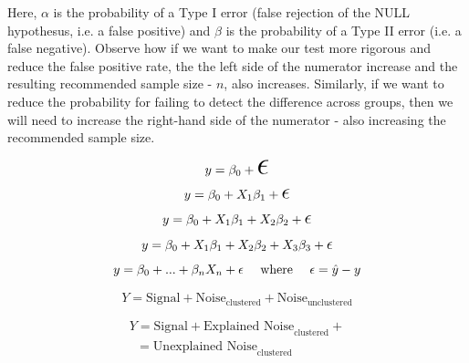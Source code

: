 \documentclass[12pt]{article}
\begin{document}
Here, $\alpha$ is the probability of a Type I error (false rejection of the NULL hypothesus, i.e. a false positive) and $\beta$ is the probability of a Type II error (i.e. a false negative). Observe how if we want to make our test more rigorous and reduce the false positive rate, the the left side of the numerator increase and the resulting recommended sample size - $n$, also increases. Similarly, if we want to reduce the probability for failing to detect the difference across groups, then we will need to increase the right-hand side of the numerator - also increasing the recommended sample size.

\newpage
\[ y = \beta_0 + \mathlarger{\mathlarger{\mathlarger{\mathlarger{\mathlarger{\mathlarger{\epsilon}}}}}} \]
\[ y = \beta_0 + X_1\beta_1 + \mathlarger{\mathlarger{\mathlarger{\epsilon}}}\]
\[ y = \beta_0 + X_1\beta_1 + X_2\beta_2 + \mathlarger{\mathlarger{\epsilon}}\]
\[ y = \beta_0 + X_1\beta_1 + X_2\beta_2 + X_3\beta_3 +\mathlarger{\epsilon}\]
\[ y = \beta_0 + ... + \beta_nX_n + \epsilon \text{\phantom{aa} where \phantom{aa}} \epsilon = \hat{y} - y\]

\newpage
\[Y = \text{Signal} + \text{Noise}_{\text{clustered}} + \text{Noise}_{\text{unclustered}} \]


\begin{center}
\begin{multline}
Y = \text{Signal} + \text{Explained Noise}_{\text{clustered}} + \\
\phantom{a} =  \text{Unexplained Noise}_{\text{clustered}} 
\end{multline}
\end{center}
\end{document}
